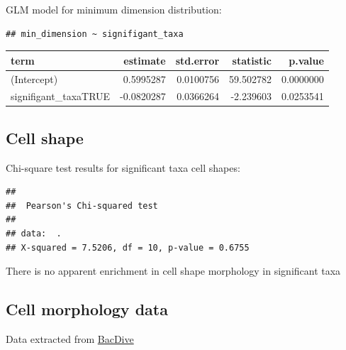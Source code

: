\documentclass[
]{article}
\begin{document}
GLM model for minimum dimension distribution:

\begin{verbatim}
## min_dimension ~ signifigant_taxa
\end{verbatim}

\begin{table}
\centering
\begin{tabular}{l|r|r|r|r}
\hline
term & estimate & std.error & statistic & p.value\\
\hline
(Intercept) & 0.5995287 & 0.0100756 & 59.502782 & 0.0000000\\
\hline
signifigant\_taxaTRUE & -0.0820287 & 0.0366264 & -2.239603 & 0.0253541\\
\hline
\end{tabular}
\end{table}

\hypertarget{cell-shape}{%
\subsection{Cell shape}\label{cell-shape}}

Chi-square test results for significant taxa cell shapes:

\begin{verbatim}
## 
##  Pearson's Chi-squared test
## 
## data:  .
## X-squared = 7.5206, df = 10, p-value = 0.6755
\end{verbatim}

There is no apparent enrichment in cell shape morphology in significant
taxa

\hypertarget{cell-morphology-data}{%
\subsection{Cell morphology data}\label{cell-morphology-data}}

Data extracted from \href{https://bacdive.dsmz.de/}{BacDive}
\end{document}

